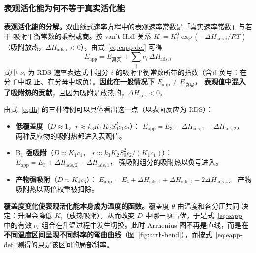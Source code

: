 \subsubsection{表观活化能为何不等于真实活化能}
\label{sssec:eapp}

\begin{principle}
\textbf{表观活化能的分解。}双曲线式速率方程中的表观速率常数是「真实速率常数」与若干
吸附平衡常数的乘积或商。按 van't Hoff 关系 $K_i=K_i^{0}\exp(-\Delta H_{\mathrm{ads},i}/RT)$
（吸附放热，$\Delta H_{\mathrm{ads},i}<0$），由式~\eqref{eq:eapp-def} 可得
\begin{equation}
E_{\mathrm{app}}=E_{\text{真实}}+\sum_i \nu_i\,\Delta H_{\mathrm{ads},i}
\label{eq:eapp}
\end{equation}
式中 $\nu_i$ 为 RDS 速率表达式中组分 $i$ 的吸附平衡常数所带的指数（含正负号：在分子中取
正、在分母中取负）。\textbf{因此在一般情况下 $E_{\mathrm{app}}\neq E_{\text{真实}}$，
表观值中混入了吸附热的贡献}，且因为吸附是放热的，$\Delta H_{\mathrm{ads}}<0$。
\end{principle}

由式~\eqref{eq:lh} 的三种特例可以具体看出这一点（以表面反应为 RDS）：

\begin{itemize}
\item \textbf{低覆盖度}（$D\approx1$，$r\approx k_3K_1K_2S_0^2c_1c_2$）：
$E_{\mathrm{app}}=E_3+\Delta H_{\mathrm{ads},1}+\Delta H_{\mathrm{ads},2}$，
两种反应物的吸附热都进入表观值。
\item \textbf{$\mathrm{B_1}$ 强吸附}（$D\approx K_1c_1$，
$r\approx k_3K_2S_0^2c_2/(K_1c_1)$）：
$E_{\mathrm{app}}=E_3+\Delta H_{\mathrm{ads},2}-\Delta H_{\mathrm{ads},1}$，
强吸附组分的吸附热以\textbf{负}号进入。
\item \textbf{产物强吸附}（$D\approx K_4c_3$）：
$E_{\mathrm{app}}=E_3+\Delta H_{\mathrm{ads},1}+\Delta H_{\mathrm{ads},2}-2\Delta H_{\mathrm{ads},4}$，
产物吸附热以两倍权重被扣除。
\end{itemize}

\textbf{覆盖度变化使表观活化能本身成为温度的函数。}覆盖度 $\theta$ 由温度和各分压共同
决定：升温会降低 $K_i$（放热吸附），从而改变 $D$ 中哪一项占优，于是式~\eqref{eq:eapp}
中的有效 $\nu_i$ 组合在升温过程中发生切换。此时 Arrhenius 图不再是直线，而是\textbf{在
不同温度区间呈现不同斜率的弯曲曲线}（图~\ref{fig:arrh-bend}），而按式~\eqref{eq:eapp-def}
测得的只是该区间的局部斜率。

